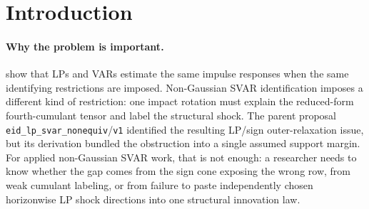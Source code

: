 \documentclass[11pt]{article}
\theoremstyle{definition}
\theoremstyle{plain}
\theoremstyle{remark}
\begin{document}
\begin{abstract}
This upgrade asks why the parent LP/sign versus non-Gaussian SVAR gap appears, not merely whether an assumed margin implies non-equivalence.  The proposed mechanism theorem decomposes the parent margin into three named channels: sign-cone support exposure, fourth-cumulant label residual, and horizonwise-to-common shock pasting defect.  The flagship conjecture defines a finite operational quantity \(\tau_w^*(P)\): the contact support loss from the horizonwise LP/sign exposed value to the best per-horizon shock-direction bundle that both pastes into one common SVAR shock and satisfies zero fourth-cumulant label residual.  The parent v1 margin \(\chi_w(P)\) is recovered algebraically as the collapsed one-channel corner when the horizonwise bundle is restricted to the diagonal common-rotation embedding and the residual is replaced by the parent cumulant-envelope filter.  If resolved, the result would turn the parent diagnostic into a mechanism-level rule for deciding whether an LP sign-restricted robustness report is sharp for the same non-Gaussian SVAR shock or only an outer relaxation.
\end{abstract}

\section{Introduction}
\paragraph{Why the problem is important.}
\citet{PlagborgMollerWolf2021} show that LPs and VARs estimate the same impulse responses when the same identifying restrictions are imposed.  Non-Gaussian SVAR identification imposes a different kind of restriction: one impact rotation must explain the reduced-form fourth-cumulant tensor and label the structural shock.  The parent proposal \texttt{eid\_lp\_svar\_nonequiv}/\texttt{v1} identified the resulting LP/sign outer-relaxation issue, but its derivation bundled the obstruction into a single assumed support margin.  For applied non-Gaussian SVAR work, that is not enough: a researcher needs to know whether the gap comes from the sign cone exposing the wrong row, from weak cumulant labeling, or from failure to paste independently chosen horizonwise LP shock directions into one structural innovation law.
\end{document}
